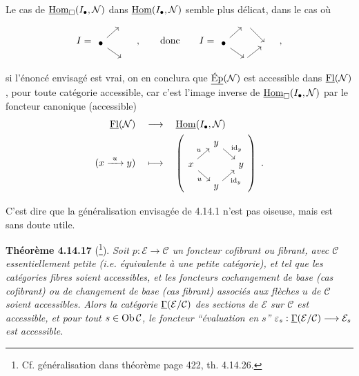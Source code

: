Le cas de $\uHom_{\square}(I_\bullet,\mathcal{N})$ dans $\uHom(I_\bullet,\mathcal{N})$ semble plus délicat, dans le cas où
\[
I = 
\begin{tikzcd}[sep=small]
 & {} \\
\bullet \arrow[ur] \arrow[dr] & \\
 & {}
\end{tikzcd}
\quad , \qquad \text{donc} \qquad
I = 
\begin{tikzcd}[sep=small]
 & {} \arrow[dr] & \\
\bullet \arrow[ur] \arrow[dr] & & {} \\
 & {} \arrow[ur] &
\end{tikzcd}
\quad ,
\]
si l'énoncé envisagé est vrai, on en conclura que $\uEp(\mathcal{N})$ est accessible dans $\uFl(\mathcal{N})$, pour toute catégorie accessible, car c'est l'image inverse de $\uHom_{\square}(I_\bullet,\mathcal{N})$ par le foncteur canonique (accessible)
\[
\begin{aligned}
\uFl(\mathcal{N}) \quad &\longrightarrow \quad \uHom(I_\bullet,\mathcal{N}) \\
(x \xrightarrow{\ u\ } y) \quad &\longmapsto \quad
\left(
\begin{tikzcd}[sep=small, ampersand replacement=\&]
 \& y \arrow[dr, "\mathrm{id}_y"] \& \\
x \arrow[ur, "u"] \arrow[dr, "u"'] \& \& y \\
 \& y \arrow[ur, "\mathrm{id}_y"'] \&
\end{tikzcd}
\right) \ .
\end{aligned}
\]


C'est dire que la généralisation envisagée de 4.14.1 n'est pas oiseuse, mais est sans doute utile.

\textbf{Théorème 4.14.17} (\footnote[168]{Cf. généralisation dans théorème page 422, th. 4.14.26.}). \textit{Soit $p : \mathcal{E} \longrightarrow \mathcal{C}$ un foncteur cofibrant ou fibrant, avec $\mathcal{C}$ essentiellement petite (i.e. équivalente à une petite catégorie), et tel que les catégories fibres soient accessibles, et les foncteurs cochangement de base (cas cofibrant) ou de changement de base (cas fibrant) associés aux flèches $u$ de $\mathcal{C}$ soient accessibles. Alors la catégorie $\uGamma(\mathcal{E}/\mathcal{C})$ des sections de $\mathcal{E}$ sur $\mathcal{C}$ est accessible, et pour tout $s \in \Ob\mathcal{C}$, le foncteur ``évaluation en $s$'' $\varepsilon_s : \uGamma(\mathcal{E}/\mathcal{C}) \longrightarrow \mathcal{E}_s$ est accessible.}

